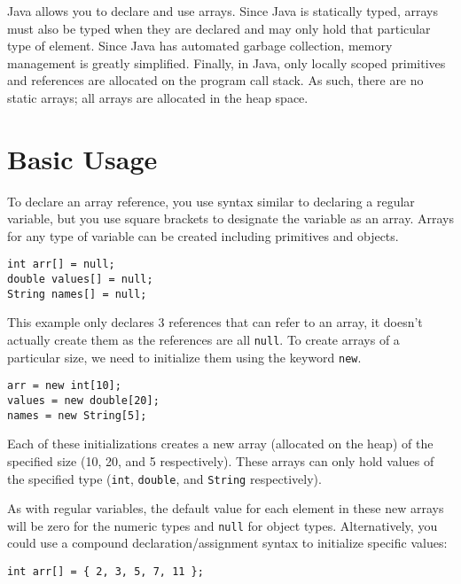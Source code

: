 

Java allows you to declare and use arrays.  Since Java is statically
typed, arrays must also be typed when they are declared and
may only hold that particular type of element.  Since Java has
automated garbage collection, memory management is greatly
simplified.  Finally, in Java, only locally scoped primitives and 
references are allocated on the program call stack.  As such,
there are no static arrays; all arrays are allocated in the heap
space.

\section{Basic Usage}

To declare an array reference, you use syntax similar to declaring
a regular variable, but you use square brackets to designate
the variable as an array.  Arrays for any type of variable can
be created including primitives and objects.

\begin{verbatim}
int arr[] = null;
double values[] = null;
String names[] = null;
\end{verbatim}

This example only declares 3 references that can refer to an array, 
it doesn't actually create them as the references are all 
\texttt{null}.  To create arrays of a particular size, we
need to initialize them using the keyword \texttt{new}.  

\begin{verbatim}
arr = new int[10];
values = new double[20];
names = new String[5];
\end{verbatim}

Each of these initializations creates a new array (allocated on the 
heap) of the specified size (10, 20, and 5 respectively).  These 
arrays can only hold values of the specified type (\texttt{int},
\texttt{double}, and \texttt{String} respectively).

As with regular variables, the default value for each element in
these new arrays will be zero for the numeric types and \texttt{null}
for object types.  Alternatively, you could use a compound declaration/assignment
syntax to initialize specific values:

\begin{verbatim}
int arr[] = { 2, 3, 5, 7, 11 };
\end{verbatim}

